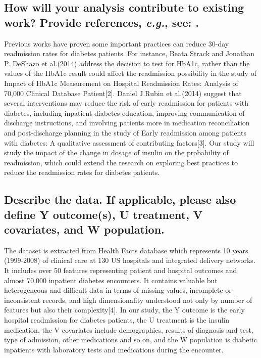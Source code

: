 \documentclass[twoside,11pt]{article}
\begin{document}
\subsection{How will your analysis contribute to existing work? Provide references, \emph{e.g.}, see: \cite{cite1}.}
Previous works have proven some important practices can reduce 30-day readmission rates for diabetes patients. For instance, Beata Strack and Jonathan P. DeShazo et al.(2014) address the decision to test for HbA1c, rather than the values of the HbA1c result could affect the readmission possibility in the study of Impact of HbA1c Measurement on Hospital Readmission Rates: Analysis of 70,000 Clinical Database Patient[2]. Daniel J.Rubin et al.(2014) suggest that several interventions may reduce the risk of early readmission for patients with diabetes, including inpatient diabetes education, improving communication of discharge instructions, and involving patients more in medication reconciliation and post-discharge planning in the study of Early readmission among patients with diabetes: A qualitative assessment of contributing factors[3].
Our study will study the impact of the change in dosage of insulin on the probability of readmission, which could extend the research on exploring best practices to reduce the readmission rates for diabetes patients. 


\subsection{Describe the data. If applicable, please also define Y outcome(s), U treatment, V covariates, and W population.}

The dataset is extracted from Health Facts database which represents 10 years (1999-2008) of clinical care at 130 US hospitals and integrated delivery networks. It includes over 50 features representing patient and hospital outcomes and almost 70,000 inpatient diabetes encounters. It contains valuable but heterogeneous and difficult data in terms of missing values, incomplete or inconsistent records, and high dimensionality understood not only by number of features but also their complexity[4].
In our study, the Y outcome is the early hospital readmission for diabetes patients, the U treatment is the insulin medication, the V covariates include demographics, results of diagnosis and test, type of admission, other medications and so on, and the W population is diabetic inpatients with laboratory tests and medications during the encounter.
 
\end{document}
